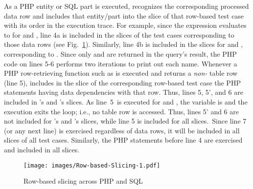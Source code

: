 As a PHP entity or SQL part is executed, \tool{} recognizes the
corresponding processed data row and includes that entity/part into
the slice of that row-based test case with its order in the execution
trace. For example, since the  expression evaluates to
 for  and , line 4a is included in
the slices of the test cases corresponding to those data rows
(see Fig.~\ref{fig:Rowbased-Slicing}). Similarly, line 4b is included in
the slices for  and , corresponding to
. Since only  and 
are returned in the query's result, the PHP code on lines 5-6 performs
two iterations to print out each name. Whenever a PHP row-retrieving
function such as  is executed and returns a
\emph{non-} table row (line 5), \tool{} includes 
in the slice of the corresponding row-based test case the PHP
statements having data dependencies with that row. Thus, lines 5, 5',
and 6 are included in 's and 's slices.
As line~5~is executed for  and
, the variable  is  and the
execution exits the  loop; i.e., no table row is accessed.
Thus, lines 5' and 6 are not included for 's and
's slices, while line 5 is included for all slices.~Since 
line 7 (or any next line) is exercised regardless of
data rows, it will be included in all slices of all test cases.
Similarly, the PHP statements before line 4 are exercised and included
in all slices.


\begin{figure}[t]
  \centering
  \texttt{[image: images/Row-based-Slicing-1.pdf]}\\ %
  \caption{Row-based slicing across PHP and SQL}\label{fig:Rowbased-Slicing}
\end{figure}
